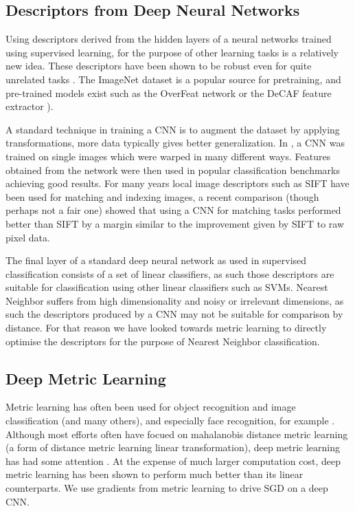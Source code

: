 \subsection {Descriptors from Deep Neural Networks}

Using descriptors derived from the hidden layers of a neural networks trained using supervised learning, for the purpose of other learning tasks is a relatively new idea. These descriptors have been shown to be robust even for quite unrelated tasks \cite{Donahue2014,Razavian2014}. The ImageNet dataset \cite{Krizhevsky2012} is a popular source for pretraining, and pre-trained models exist such as the OverFeat network \cite{Sermanet2013} or the DeCAF feature extractor \cite{Donahue2014}). 

A standard technique in training a \gls{CNN} is to augment the dataset by applying transformations, more data typically gives better generalization. In \cite{Dosovitskiy2013}, a \gls{CNN} was trained on single images which were warped in many different ways. Features obtained from the network were then used in popular classification benchmarks achieving good results. For many years local image descriptors such as \gls{SIFT} \cite{Lowe2004} have been used for matching and indexing images, a recent comparison \cite{Fischer2014} (though perhaps not a fair one) showed that using a \gls{CNN} for matching tasks performed better than \gls{SIFT} by a margin similar to the improvement given by \gls{SIFT} to raw pixel data.


The final layer of a standard deep neural network as used in supervised classification consists of a set of linear classifiers, as such those descriptors are suitable for classification using other linear classifiers such as SVMs. Nearest Neighbor suffers from high dimensionality and noisy or irrelevant dimensions, as such the descriptors produced by a CNN may not be suitable for comparison by distance. For that reason we have looked towards metric learning to directly optimise the descriptors for the purpose of Nearest Neighbor classification. 


\subsection {Deep Metric Learning}


Metric learning has often been used for object recognition and image classification \cite{Hadsell2006,Min2009} (and many others), and especially face recognition, for example \cite{Kostinger2012}. Although most efforts often have focued on mahalanobis distance metric learning (a form of distance metric learning linear transformation), deep metric learning has had some attention \cite {Salakhutdinov2007a,Min2009,Weston2009,Min2010}. At the expense of much larger computation cost, deep metric learning has been shown to perform much better than its linear counterparts. We use gradients from metric learning to drive \gls{SGD} on a deep \gls{CNN}. 

